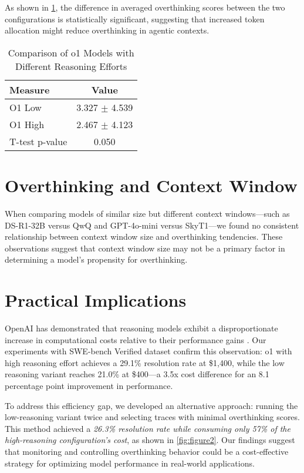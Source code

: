 As shown in \cref{tab:o1_model_comparison}, the difference in averaged overthinking scores between the two configurations is statistically significant, suggesting that increased token allocation might reduce overthinking in agentic contexts.

\begin{table}[ht]
\centering
\begin{tabular}{lc}
\toprule
\textbf{Measure} & \textbf{Value} \\
\midrule
O1 Low        & 3.327 $\pm$ 4.539 \\
O1 High       & 2.467 $\pm$ 4.123 \\
\midrule
T-test p-value & 0.050 \\
\bottomrule
\end{tabular}
\caption{Comparison of o1 Models with Different Reasoning Efforts}
\label{tab:o1_model_comparison}
\end{table}

\section{Overthinking and Context Window}
\label{sec:context_window}

When comparing models of similar size but different context windows—such as DS-R1-32B versus QwQ and GPT-4o-mini versus SkyT1—we found no consistent relationship between context window size and overthinking tendencies. These observations suggest that context window size may not be a primary factor in determining a model's propensity for overthinking.

\section{Practical Implications}
\label{sec:implications}

OpenAI has demonstrated that reasoning models exhibit a disproportionate increase in computational costs relative to their performance gains \cite{arcprize2024oai}. Our experiments with SWE-bench Verified dataset confirm this observation: o1 with high reasoning effort achieves a 29.1\% resolution rate at \$1,400, while the low reasoning variant reaches 21.0\% at \$400—a 3.5x cost difference for an 8.1 percentage point improvement in performance.

To address this efficiency gap, we developed an alternative approach: running the low-reasoning variant twice and selecting traces with minimal overthinking scores. This method achieved a \textit{26.3\% resolution rate while consuming only 57\% of the high-reasoning configuration's cost}, as shown in \cref{fig:figure2}. Our findings suggest that monitoring and controlling overthinking behavior could be a cost-effective strategy for optimizing model performance in real-world applications.